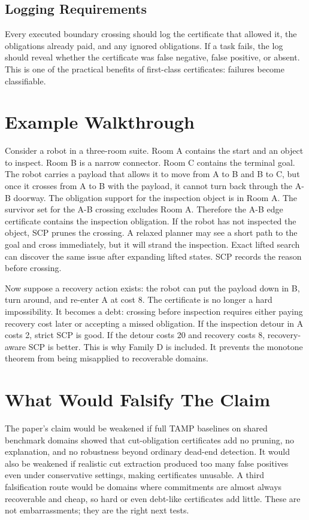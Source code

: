 \documentclass{article}
\begin{document}
\subsection{Logging Requirements}

Every executed boundary crossing should log the certificate that allowed it, the obligations already paid, and any ignored obligations. If a task fails, the log should reveal whether the certificate was false negative, false positive, or absent. This is one of the practical benefits of first-class certificates: failures become classifiable.

\section{Example Walkthrough}

Consider a robot in a three-room suite. Room A contains the start and an object to inspect. Room B is a narrow connector. Room C contains the terminal goal. The robot carries a payload that allows it to move from A to B and B to C, but once it crosses from A to B with the payload, it cannot turn back through the A-B doorway. The obligation support for the inspection object is in Room A. The survivor set for the A-B crossing excludes Room A. Therefore the A-B edge certificate contains the inspection obligation. If the robot has not inspected the object, SCP prunes the crossing. A relaxed planner may see a short path to the goal and cross immediately, but it will strand the inspection. Exact lifted search can discover the same issue after expanding lifted states. SCP records the reason before crossing.

Now suppose a recovery action exists: the robot can put the payload down in B, turn around, and re-enter A at cost 8. The certificate is no longer a hard impossibility. It becomes a debt: crossing before inspection requires either paying recovery cost later or accepting a missed obligation. If the inspection detour in A costs 2, strict SCP is good. If the detour costs 20 and recovery costs 8, recovery-aware SCP is better. This is why Family D is included. It prevents the monotone theorem from being misapplied to recoverable domains.

\section{What Would Falsify The Claim}

The paper's claim would be weakened if full TAMP baselines on shared benchmark domains showed that cut-obligation certificates add no pruning, no explanation, and no robustness beyond ordinary dead-end detection. It would also be weakened if realistic cut extraction produced too many false positives even under conservative settings, making certificates unusable. A third falsification route would be domains where commitments are almost always recoverable and cheap, so hard or even debt-like certificates add little. These are not embarrassments; they are the right next tests.
\end{document}
